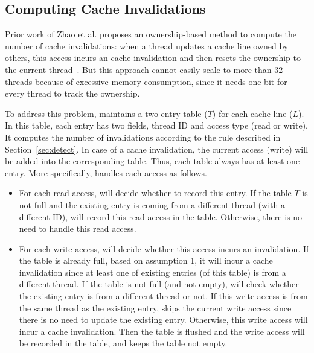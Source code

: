 \subsection{Computing Cache Invalidations}
\label{sec:computeinvalidations}

Prior work of Zhao et al. proposes an ownership-based method to compute the number of cache invalidations: when a thread updates a cache line owned by others, this access incurs an cache invalidation and then resets the ownership to the current thread~\cite{qinzhao}. But this approach cannot easily scale to more than 32 threads because of excessive memory consumption, since it needs one bit for every thread to track the ownership.  

To address this problem, \Cheetah{} maintains a two-entry table ($T$) for each cache line ($L$). In this table, each entry has two fields, thread ID and access type (read or write). It computes the number of invalidations according to the rule described in Section~\ref{sec:detect}. In case of a cache invalidation, the current access (write) will be added into the corresponding table. Thus, each table always has at least one entry. More specifically, \cheetah{} handles each access as follows.

\begin{itemize}
\item
For each read access, \cheetah{} will decide whether to record this entry. If the table $T$ is not full and the existing entry is coming from a different thread (with a different ID), \cheetah{} will record this read access in the table. Otherwise, there is no need to handle this read access. 
  
  \item
  For each write access, \cheetah{} will decide whether this access incurs an invalidation. If the table is already full, based on assumption 1, it will incur a cache invalidation since at least one of existing entries (of this table) is from a different thread. If the table is not full (and not empty), \cheetah{} will check whether the existing entry is from a different thread or not. If this write access is from the same thread as the existing entry, \cheetah{} skips the current write access since there is no need to update the existing entry. Otherwise, this write access will incur a cache invalidation. Then the table is flushed and the write access will be recorded in the table, and keeps the table not empty.
  
\end{itemize}
     
